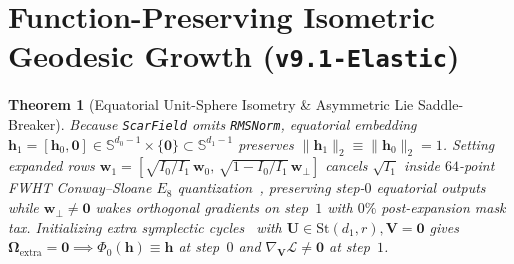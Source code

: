 \documentclass[10pt,twocolumn]{article}
\newtheorem{theorem}{Theorem}
\begin{document}
\section{Function-Preserving Isometric Geodesic Growth (\texttt{v9.1-Elastic})}
\begin{theorem}[Equatorial Unit-Sphere Isometry \& Asymmetric Lie Saddle-Breaker]
\label{thm:v91_isometry}
Because \texttt{ScarField} omits \texttt{RMSNorm}, equatorial embedding $\mathbf{h}_1 = [\mathbf{h}_0, \mathbf{0}] \in \mathbb{S}^{d_0-1} \times \{\mathbf{0}\} \subset \mathbb{S}^{d_1-1}$ preserves $\|\mathbf{h}_1\|_2 \equiv \|\mathbf{h}_0\|_2 = 1$. Setting expanded rows $\mathbf{w}_1 = [\sqrt{I_0/I_1}\,\mathbf{w}_0,\, \sqrt{1 - I_0/I_1}\,\mathbf{w}_\perp]$ cancels $\sqrt{I_1}$ inside $64$-point FWHT Conway--Sloane $E_8$ quantization~\citep{conway1982fast,viazovska2017sphere}, preserving step-$0$ equatorial outputs while $\mathbf{w}_\perp \neq \mathbf{0}$ wakes orthogonal gradients on step~$1$ with $0\%$ post-expansion mask tax. Initializing extra symplectic cycles~\citep{hairer2006geometric} with $\mathbf{U} \in \mathrm{St}(d_1, r), \mathbf{V}=\mathbf{0}$ gives $\boldsymbol{\Omega}_{\text{extra}}=\mathbf{0} \implies \Phi_0(\mathbf{h})\equiv\mathbf{h}$ at step~$0$ and $\nabla_{\mathbf{V}}\mathcal{L} \neq \mathbf{0}$ at step~$1$.
\end{theorem}
\end{document}
